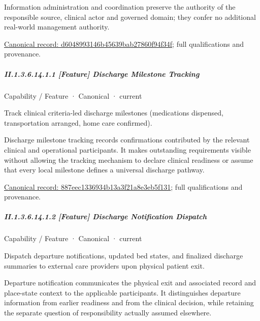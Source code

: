 Information administration and coordination preserve the authority of the responsible source, clinical actor and governed domain; they confer no additional real-world management authority.


{\footnotesize \href{../../../../continuum/strategy/capability/d6048993146b45639bab27860f94f34f.md}{Canonical record: d6048993146b45639bab27860f94f34f}; full qualifications and provenance.}\par
\subparagraph*{II.1.3.6.14.1.1 [Feature] Discharge Milestone Tracking}
\label{navigation:II.1.3.6.14.1.1}

\label{element:887eec1336934b13a3f21a8e3eb5f131}
{\small Capability / Feature · Canonical · current}\par

Track clinical criteria-led discharge milestones (medications dispensed, transportation arranged, home care confirmed).



Discharge milestone tracking records confirmations contributed by the relevant clinical and operational participants. It makes outstanding requirements visible without allowing the tracking mechanism to declare clinical readiness or assume that every local milestone defines a universal discharge pathway.


{\footnotesize \href{../../../../continuum/strategy/capability/feature/887eec1336934b13a3f21a8e3eb5f131.md}{Canonical record: 887eec1336934b13a3f21a8e3eb5f131}; full qualifications and provenance.}\par
\subparagraph*{II.1.3.6.14.1.2 [Feature] Discharge Notification Dispatch}
\label{navigation:II.1.3.6.14.1.2}

\label{element:5476307ca5a34590aa7025ab59ca0c10}
{\small Capability / Feature · Canonical · current}\par

Dispatch departure notifications, updated bed states, and finalized discharge summaries to external care providers upon physical patient exit.



Departure notification communicates the physical exit and associated record and place-state context to the applicable participants. It distinguishes departure information from earlier readiness and from the clinical decision, while retaining the separate question of responsibility actually assumed elsewhere.


